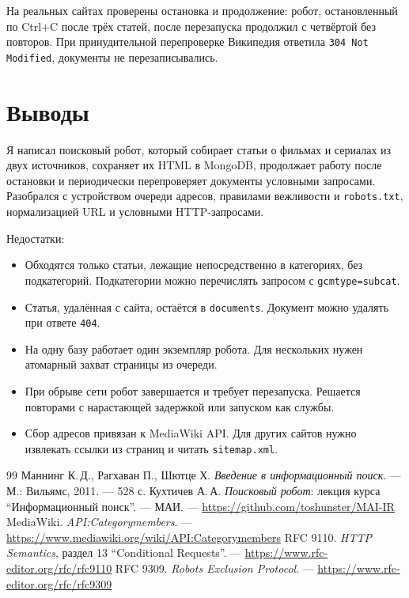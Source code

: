 \documentclass[12pt,a4paper,oneside,fleqn]{article}
\begin{document}
На реальных сайтах проверены остановка и продолжение: робот, остановленный по Ctrl+C после трёх статей, после перезапуска продолжил с четвёртой без повторов. При принудительной перепроверке Википедия ответила \texttt{304 Not Modified}, документы не перезаписывались.

\pagebreak

\section{Выводы}

Я написал поисковый робот, который собирает статьи о фильмах и сериалах из двух источников, сохраняет их HTML в MongoDB, продолжает работу после остановки и периодически перепроверяет документы условными запросами. Разобрался с устройством очереди адресов, правилами вежливости и \texttt{robots.txt}, нормализацией URL и условными HTTP-запросами.

Недостатки:

\begin{itemize}
    \item Обходятся только статьи, лежащие непосредственно в категориях, без подкатегорий. Подкатегории можно перечислять запросом с \texttt{gcmtype=subcat}.
    \item Статья, удалённая с сайта, остаётся в \texttt{documents}. Документ можно удалять при ответе \texttt{404}.
    \item На одну базу работает один экземпляр робота. Для нескольких нужен атомарный захват страницы из очереди.
    \item При обрыве сети робот завершается и требует перезапуска. Решается повторами с нарастающей задержкой или запуском как службы.
    \item Сбор адресов привязан к MediaWiki API. Для других сайтов нужно извлекать ссылки из страниц и читать \texttt{sitemap.xml}.
\end{itemize}

\pagebreak

\begin{thebibliography}{99}
Маннинг К.\,Д., Рагхаван П., Шютце Х. {\itshape Введение в информационный поиск}. --- М.: Вильямс, 2011. --- 528 с.
Кухтичев А.\,А. {\itshape Поисковый робот}: лекция курса \enquote{Информационный поиск}. --- МАИ. --- \url{https://github.com/toshunster/MAI-IR}
MediaWiki. {\itshape API:Categorymembers}. --- \url{https://www.mediawiki.org/wiki/API:Categorymembers}
RFC 9110. {\itshape HTTP Semantics}, раздел 13 \enquote{Conditional Requests}. --- \url{https://www.rfc-editor.org/rfc/rfc9110}
RFC 9309. {\itshape Robots Exclusion Protocol}. --- \url{https://www.rfc-editor.org/rfc/rfc9309}
\end{thebibliography}
\end{document}
